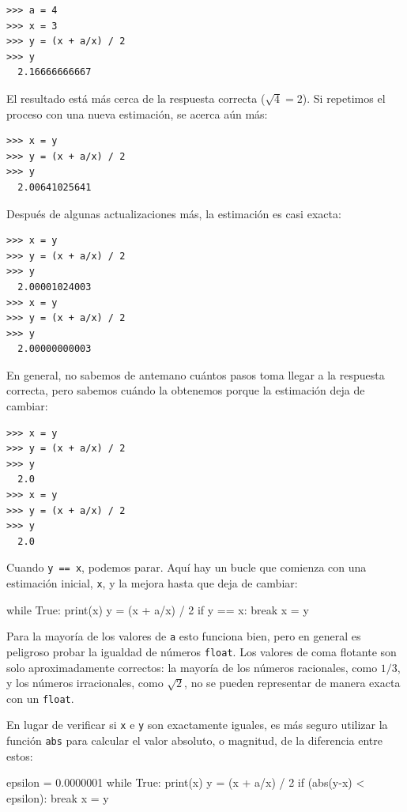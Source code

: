 \begin{Verbatim}[frame=single]
>>> a = 4
>>> x = 3
>>> y = (x + a/x) / 2
>>> y
  2.16666666667
\end{Verbatim}
%
El resultado está más cerca de la respuesta correcta ($\sqrt{4} = 2$).  Si
repetimos el proceso con una nueva estimación, se acerca aún más:

\begin{Verbatim}[frame=single]
>>> x = y
>>> y = (x + a/x) / 2
>>> y
  2.00641025641
\end{Verbatim}
%
Después de algunas actualizaciones más, la estimación es casi exacta:

\begin{Verbatim}[frame=single]
>>> x = y
>>> y = (x + a/x) / 2
>>> y
  2.00001024003
>>> x = y
>>> y = (x + a/x) / 2
>>> y
  2.00000000003
\end{Verbatim}
%
En general, no sabemos de antemano cuántos pasos toma
llegar a la respuesta correcta, pero sabemos cuándo la obtenemos
porque la estimación
deja de cambiar:

\begin{Verbatim}[frame=single]
>>> x = y
>>> y = (x + a/x) / 2
>>> y
  2.0
>>> x = y
>>> y = (x + a/x) / 2
>>> y
  2.0
\end{Verbatim}
%
Cuando \texttt{y == x}, podemos parar.  Aquí hay un bucle que comienza
con una estimación inicial, \texttt{x}, y la mejora hasta que
deja de cambiar:

\begin{python}[frame=single]
while True:
    print(x)
    y = (x + a/x) / 2
    if y == x:
        break
    x = y
\end{python}
%
Para la mayoría de los valores de \texttt{a} esto funciona bien, pero en general es peligroso probar la igualdad de números \texttt{float}.
Los valores de coma flotante son solo aproximadamente correctos:
la mayoría de los números racionales, como $1/3$, y los números irracionales, como $\sqrt{2}$, no se pueden representar de manera exacta con un \texttt{float}.

En lugar de verificar si \texttt{x} e \texttt{y} son exactamente iguales, es
más seguro utilizar la función \texttt{abs} para calcular el
valor absoluto, o magnitud, de la diferencia entre estos:

\begin{python}[frame=single]
epsilon = 0.0000001
while True:
    print(x)
    y = (x + a/x) / 2
    if (abs(y-x) < epsilon):
        break
    x = y
\end{python}

